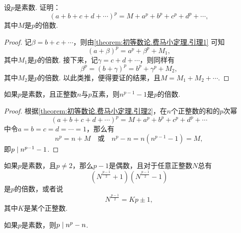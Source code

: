 \begin{lemma}\label{theorem:初等数论.费马小定理.引理2}
设\(p\)是素数.
证明：\begin{equation*}
(a+b+c+d+\dotsb)^p = M + a^p + b^p + c^p + d^p + \dotsb,
\end{equation*}其中\(M\)是\(p\)的倍数.
\begin{proof}
记\(\beta=b+c+\dotsb\)，则由\cref{theorem:初等数论.费马小定理.引理1} 可知\begin{equation*}
(a+\beta)^p = a^p + \beta^p + M_1,
\end{equation*}其中\(M_1\)是\(p\)的倍数.
接下来，记\(\gamma=c+d+\dotsb\)，则同样有\begin{equation*}
\beta^p = (b+\gamma)^p = b^p + \gamma^p + M_2,
\end{equation*}其中\(M_2\)是\(p\)的倍数.
以此类推，便得要证的结果，且\(M = M_1+M_2+\dotsb\).
\end{proof}
\end{lemma}

\begin{theorem}[费马小定理]\label{theorem:初等数论.费马小定理}
如果\(p\)是素数，且正整数\(n\)与\(p\)互素，则\(n^{p-1}-1\)是\(p\)的倍数.
\begin{proof}
根据\cref{theorem:初等数论.费马小定理.引理2}，在\(n\)个正整数的和的\(p\)次幂\begin{equation*}
(a+b+c+d+\dotsb)^p = M + a^p + b^p + c^p + d^p + \dotsb
\end{equation*}中令\(a=b=c=d=\dotsb=1\)，那么有\begin{equation*}
n^p = n + M
\quad\text{或}\quad
n^p - n = n(n^{p-1}-1) = M,
\end{equation*}即\(\truediv{n^{p-1}-1}{p}\).
\end{proof}
\end{theorem}

\begin{corollary}
如果\(p\)是素数，且\(p\neq2\)，那么\(p-1\)是偶数，且对于任意正整数\(N\)总有\begin{equation*}
\left(N^{\frac{p-1}{2}}+1\right)
\left(N^{\frac{p-1}{2}}-1\right)
\end{equation*}是\(p\)的倍数，或者说\begin{equation*}
N^{\frac{p-1}{2}} = Kp\pm1,
\end{equation*}其中\(K\)是某个正整数.
\end{corollary}

\begin{corollary}[费马小定理']
如果\(p\)是素数，则\(\truediv{n^p-n}{p}\).
\end{corollary}

